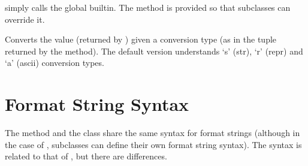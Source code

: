 \documentclass[letterpaper,10pt,english]{sphinxmanual}
\begin{document}
\begin{fulllineitems}
\begin{fulllineitems}
\label{\detokenize{string:string.Formatter.format_field}}
{\hyperref[\detokenize{string:string.Formatter.format_field}]{}} simply calls the global {\hyperref[\detokenize{string:string.Formatter.format}]{}} built\sphinxhyphen{}in.  The
method is provided so that subclasses can override it.

\end{fulllineitems}


\begin{fulllineitems}
\label{\detokenize{string:string.Formatter.convert_field}}
Converts the value (returned by {\hyperref[\detokenize{string:string.Formatter.get_field}]{}}) given a conversion type
(as in the tuple returned by the {\hyperref[\detokenize{string:string.Formatter.parse}]{}} method).  The default
version understands ‘s’ (str), ‘r’ (repr) and ‘a’ (ascii) conversion
types.

\end{fulllineitems}


\end{fulllineitems}



\section{Format String Syntax}
\label{\detokenize{string:format-string-syntax}}\label{\detokenize{string:formatstrings}}
The  method and the {\hyperref[\detokenize{string:string.Formatter}]{}} class share the same
syntax for format strings (although in the case of {\hyperref[\detokenize{string:string.Formatter}]{}},
subclasses can define their own format string syntax).  The syntax is
related to that of , but
there are differences.
\end{document}
